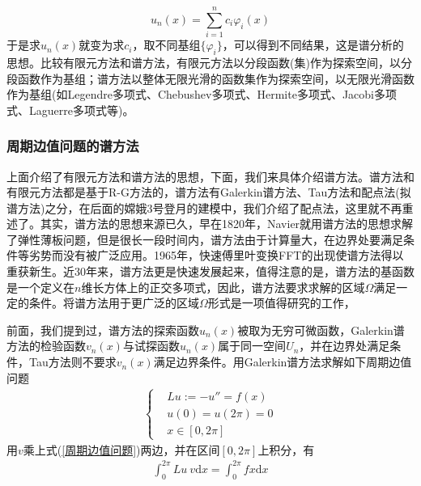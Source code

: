             \[
                u_n(x) = \sum_{i = 1}^n c_i \varphi_i(x)
            \]
            于是求$u_n(x)$就变为求$c_i$，取不同基组$\{\varphi_i\}$，可以得到不同结果，这是谱分析的思想。比较有限元方法和谱方法，有限元方法以分段函数(集)作为探索空间，以分段函数作为基组；谱方法以整体无限光滑的函数集作为探索空间，以无限光滑函数作为基组(如Legendre多项式、Chebushev多项式、Hermite多项式、Jacobi多项式、Laguerre多项式等)。
            \subsubsection{周期边值问题的谱方法}
                \label{subsubsec:周期边值问题的谱方法}
                \par
                上面介绍了有限元方法和谱方法的思想，下面，我们来具体介绍谱方法。谱方法和有限元方法都是基于R-G方法的，谱方法有Galerkin谱方法、Tau方法和配点法(拟谱方法)之分，在后面的嫦娥3号登月的建模中，我们介绍了配点法，这里就不再重述了。其实，谱方法的思想来源已久，早在1820年，Navier就用谱方法的思想求解了弹性薄板问题，但是很长一段时间内，谱方法由于计算量大，在边界处要满足条件等劣势而没有被广泛应用。1965年，快速傅里叶变换FFT的出现使谱方法得以重获新生。近30年来，谱方法更是快速发展起来，值得注意的是，谱方法的基函数是一个定义在$n$维长方体上的正交多项式，因此，谱方法要求求解的区域$\Omega$满足一定的条件。将谱方法用于更广泛的区域$\Omega$形式是一项值得研究的工作，
                \par
                前面，我们提到过，谱方法的探索函数$u_n(x)$被取为无穷可微函数，Galerkin谱方法的检验函数$v_n(x)$与试探函数$u_n(x)$属于同一空间$U_n$，并在边界处满足条件，Tau方法则不要求$v_n(x)$满足边界条件。用Galerkin谱方法求解如下周期边值问题
                \begin{align}
                    \label{周期边值问题}
                    \left\{
                        \begin{aligned}
                            &Lu:= - u'' = f(x)\\
                            &u(0) = u(2\pi) = 0\\
                            &x\in [0,2\pi]
                        \end{aligned}
                    \right.
                \end{align}
                用$v$乘上式(\ref{周期边值问题})两边，并在区间$[0,2\pi]$上积分，有
                \begin{align*}
                    \int_0^{2\pi} Lu\ v \mathrm{d}x = \int _0^{2\pi}  f x\mathrm{d}x
                \end{align*}

